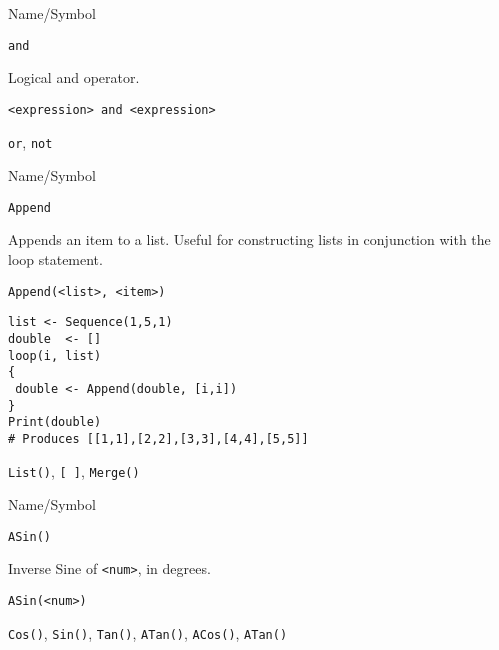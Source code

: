 \begin{desc}{Name/Symbol}
\item[Name/Symbol]  	\verb+and+
  
\item[Description]  	Logical and operator.

\item[Usage]       	
\begin{verbatim}
<expression> and <expression>
\end{verbatim}

\item[Example]	

\item[See Also]     	\verb+or+, \verb+not+

\end{desc}




\begin{desc}{Name/Symbol}

\item[Name/Symbol]  	\verb+Append+
  
\item[Description]  	Appends an item to a list.  Useful for constructing lists in conjunction with the loop statement.

\item[Usage] 
\begin{verbatim}
Append(<list>, <item>)
\end{verbatim}

\item[Example]
\begin{verbatim}
list <- Sequence(1,5,1)
double  <- []
loop(i, list)
{
 double <- Append(double, [i,i])
}
Print(double)
# Produces [[1,1],[2,2],[3,3],[4,4],[5,5]]
\end{verbatim}

\item[See Also]     	\verb+List()+, \verb+[ ]+, \verb+Merge()+
\end{desc}





\begin{desc}{Name/Symbol}

\item[Name/Symbol]  	\verb+ASin()+ 

\item[Description]  	Inverse Sine of \verb+<num>+, in degrees.

\item[Usage]
\begin{verbatim}
ASin(<num>)
\end{verbatim}

\item[Example]	

\item[See Also]    	 \verb+Cos()+, \verb+Sin()+, \verb+Tan()+, \verb+ATan()+, \verb+ACos()+, \verb+ATan()+ 
\end{desc}





